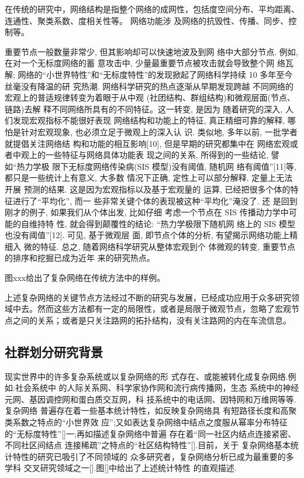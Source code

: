 			在传统的研究中，网络结构是指整个网络的成网性，包括度空间分布、平均距离、连通性、聚类系数、度相关性等。 网络功能涉 及网络的抗毁性、传播、同步、控制等。

			重要节点一般数量非常少, 但其影响却可以快速地波及到网 络中大部分节点. 例如, 在对一个无标度网络的蓄 意攻击中, 少量最重要节点被攻击就会导致整个网 络瓦解; 网络的“小世界特性”和“无标度特性”的发现掀起了网络科学持续 10 多年至今丝毫没有降温的研 究热潮. 网络科学研究的热点逐渐从早期发现跨越 不同网络的宏观上的普适规律转变为着眼于从中观 (社团结构、群组结构)和微观层面(节点、链路)去解 释不同网络所具有的不同特征。这一转变, 是因为 随着研究的深入, 人们发现宏观指标不能很好表现 网络结构和功能上的特征, 真正精细可靠的解释, 哪 怕是针对宏观现象, 也必须立足于微观上的深入认 识. 类似地, 多年以前, 一批学者就提倡关注网络结 构和功能的相互影响[10], 但是早期的研究都集中在 网络宏观或者中观上的一些特征与网络具体功能表 现之间的关系, 所得到的一些结论, 譬如“热力学极 限下无标度网络传染病(SIS 模型)没有阈值, 随机网 络有阈值”[11]等, 都只是一些统计上有意义, 大多数 情况下正确, 定性上可以部分解释, 定量上无法开展 预测的结果. 这是因为宏观指标以及基于宏观量的 运算, 已经把很多个体的特征进行了“平均化”, 而一 些非常关键个体的表现被这种“平均化”淹没了. 还 是回到刚才的例子, 如果我们从个体出发, 比如仔细 考虑一个节点在 SIS 传播动力学中可能的自维持特 性, 就会得到颠覆性的结论: “热力学极限下随机网 络上的 SIS 模型也没有阈值”[12]. 可见, 基于微观层 面, 即节点个体的分析, 有望揭示网络功能上精细入 微的特征. 总之, 随着网络科学研究从整体宏观到个 体微观的转变, 重要节点的排序和挖掘已成为近年 来的研究热点。

			图xxx给出了复杂网络在传统方法中的样例。

			上述复杂网络的关键节点方法经过不断的研究与发展，已经成功应用于众多研究领域中去。然而这些方法都有一定的局限性，或者是局限于微观节点，忽略了宏观节点之间的关系；或者是只关注路网的拓扑结构，没有关注路网的内在车流信息。
			

\subsection{社群划分研究背景}
现实世界中的许多复杂系统或以复杂网络的形 式存在、或能被转化成复杂网络.例如:社会系统中 的人际关系网、科学家协作网和流行病传播网，生态 系统中的神经元网、基因调控网和蛋白质交互网，科 技系统中的电话网、因特网和万维网等等.复杂网络 普遍存在着一些基本统计特性，如反映复杂网络具 有短路径长度和高聚类系数之特点的“小世界效 应”;又如表达复杂网络中结点之度服从幂率分布特征的“无标度特性”[]一;再如描述复杂网络中普遍 存在着“同一社区内结点连接紧密、不同社区间结点 连接稀疏”之特点的“社区结构特性”[].目前，关于 复杂网络基本统计特性的研究已吸引了不同领域的 众多研究者，复杂网络分析已成为最重要的多学科 交叉研究领域之一[].图[]中给出了上述统计特性 的直观描述.


